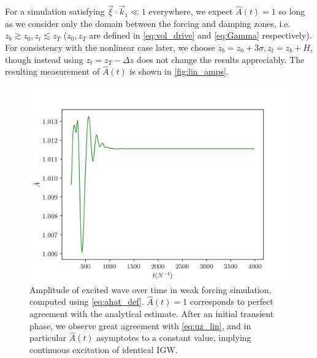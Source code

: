 \documentclass[
        fleqn,
        usenatbib,
    ]{mnras}
\begin{document}
For a simulation satisfying $\vec{\xi} \cdot \vec{k}_1 \ll 1$ everywhere, we
expect $\hat{A}(t) = 1$ so long as we consider only the domain between the
forcing and damping zones, i.e.\  $z_b \gtrsim z_0, z_t \lesssim z_T$ ($z_0,
z_T$ are defined in \autoref{eq:vol_drive} and \autoref{eq:Gamma} respectively).
For consistency with the nonlinear case later, we choose $z_b = z_0 + 3\sigma,
z_t = z_b + H$, though instead using $z_t = z_T - \Delta z$ does not change the
results appreciably. The resulting measurement of $\hat{A}(t)$ is shown in
\autoref{fig:lin_amps}.
\begin{figure}[t]
    \centering
    \includegraphics[width=\columnwidth]{plots/lin_amps.png}
    \caption{Amplitude of excited wave over time in weak forcing simulation,
    computed using \autoref{eq:ahat_def}. $\hat{A}(t) = 1$ corresponds to
    perfect agreement with the analytical estimate. After an initial transient
    phase, we observe great agreement with \autoref{eq:uz_lin}, and in
    particular $\hat{A}(t)$ asymptotes to a constant value, implying continuous
    excitation of identical IGW.}\label{fig:lin_amps}
\end{figure}
\end{document}
